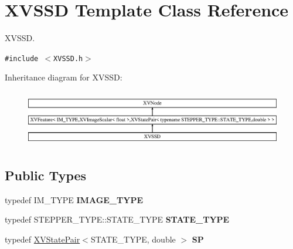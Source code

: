 \hypertarget{class_XVSSD}{
\section{XVSSD  Template Class Reference}
\label{XVSSD}
}
XVSSD. 


{\tt \#include $<$XVSSD.h$>$}

Inheritance diagram for XVSSD:\begin{figure}[H]
\begin{center}
\leavevmode
\includegraphics[height=2.48889cm]{class_XVSSD}
\end{center}
\end{figure}
\subsection*{Public Types}
\begin{CompactItemize}
\item 
typedef IM\_\-TYPE {\bf IMAGE\_\-TYPE}
\item 
typedef STEPPER\_\-TYPE::STATE\_\-TYPE {\bf STATE\_\-TYPE}
\item 
typedef \hyperlink{class_XVStatePair}{XVState\-Pair}$<$STATE\_\-TYPE, double $>$ {\bf SP}
\end{CompactItemize}

